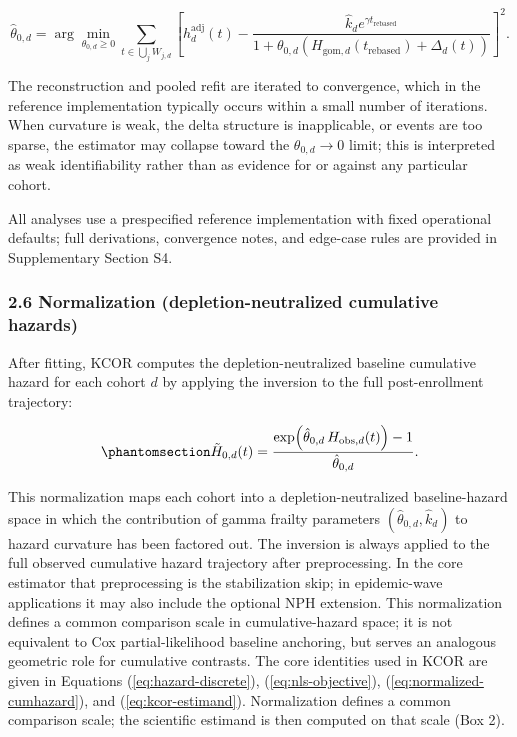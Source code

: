 \documentclass[
]{article}
\begin{document}
\[
\hat{\theta}_{0,d}
=
\arg\min_{\theta_{0,d}\ge0}
\sum_{t \in \bigcup_j W_{j,d}}
\left[
h_d^{\mathrm{adj}}(t)-
\frac{\hat{k}_d e^{\gamma t_{\mathrm{rebased}}}}{1+\theta_{0,d}\left(H_{\mathrm{gom},d}(t_{\mathrm{rebased}})+\Delta_d(t)\right)}
\right]^2 .
\]

The reconstruction and pooled refit are iterated to convergence, which
in the reference implementation typically occurs within a small number
of iterations. When curvature is weak, the delta structure is
inapplicable, or events are too sparse, the estimator may collapse
toward the \(\theta_{0,d}\to0\) limit; this is interpreted as weak
identifiability rather than as evidence for or against any particular
cohort.

All analyses use a prespecified reference implementation with fixed
operational defaults; full derivations, convergence notes, and edge-case
rules are provided in Supplementary Section S4.

\subsubsection{2.6 Normalization (depletion-neutralized cumulative
hazards)}\label{normalization-depletion-neutralized-cumulative-hazards}

After fitting, KCOR computes the depletion-neutralized baseline
cumulative hazard for each cohort \(d\) by applying the inversion to the
full post-enrollment trajectory:

\begin{equation}\protect\phantomsection\label{eq:normalized-cumhazard}{
\tilde H_{0,d}(t) = \frac{\exp\!\left(\hat{\theta}_{0,d}\,H_{\mathrm{obs},d}(t)\right)-1}{\hat{\theta}_{0,d}}.
}\end{equation}

This normalization maps each cohort into a depletion-neutralized
baseline-hazard space in which the contribution of gamma frailty
parameters \((\hat{\theta}_{0,d}, \hat{k}_d)\) to hazard curvature has
been factored out. The inversion is always applied to the full observed
cumulative hazard trajectory after preprocessing. In the core estimator
that preprocessing is the stabilization skip; in epidemic-wave
applications it may also include the optional NPH extension. This
normalization defines a common comparison scale in cumulative-hazard
space; it is not equivalent to Cox partial-likelihood baseline
anchoring, but serves an analogous geometric role for cumulative
contrasts. The core identities used in KCOR are given in Equations
(\ref{eq:hazard-discrete}), (\ref{eq:nls-objective}),
(\ref{eq:normalized-cumhazard}), and (\ref{eq:kcor-estimand}).
Normalization defines a common comparison scale; the scientific estimand
is then computed on that scale (Box 2).
\end{document}
